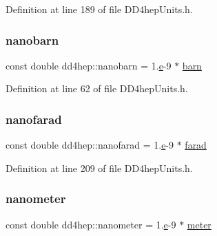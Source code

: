 Definition at line 189 of file D\+D4hep\+Units.\+h.

\hypertarget{namespacedd4hep_a7a705d86fd74fe189400eed71a94fc0c}{}\label{namespacedd4hep_a7a705d86fd74fe189400eed71a94fc0c} 
\subsubsection{\texorpdfstring{nanobarn}{nanobarn}}
{\footnotesize\ttfamily const double dd4hep\+::nanobarn = 1.\hyperlink{_volumes_8cpp_a8a9a1f93e9b09afccaec215310e64142}{e}-\/9 $\ast$ \hyperlink{namespacedd4hep_a561a205dfb5e2f3151e032ad640f1d35}{barn}\hspace{0.3cm}{\ttfamily [static]}}



Definition at line 62 of file D\+D4hep\+Units.\+h.

\hypertarget{namespacedd4hep_aa28fb5121932b99b25e9601baaac3545}{}\label{namespacedd4hep_aa28fb5121932b99b25e9601baaac3545} 
\subsubsection{\texorpdfstring{nanofarad}{nanofarad}}
{\footnotesize\ttfamily const double dd4hep\+::nanofarad = 1.\hyperlink{_volumes_8cpp_a8a9a1f93e9b09afccaec215310e64142}{e}-\/9 $\ast$ \hyperlink{namespacedd4hep_a520a532361cb9086c6d4c69ac195ddba}{farad}\hspace{0.3cm}{\ttfamily [static]}}



Definition at line 209 of file D\+D4hep\+Units.\+h.

\hypertarget{namespacedd4hep_af784647fab76654e26b09a341d3f9210}{}\label{namespacedd4hep_af784647fab76654e26b09a341d3f9210} 
\subsubsection{\texorpdfstring{nanometer}{nanometer}}
{\footnotesize\ttfamily const double dd4hep\+::nanometer = 1.\hyperlink{_volumes_8cpp_a8a9a1f93e9b09afccaec215310e64142}{e}-\/9 $\ast$ \hyperlink{namespacedd4hep_a46f5cf0231796af4296a307a58812b06}{meter}\hspace{0.3cm}{\ttfamily [static]}}



